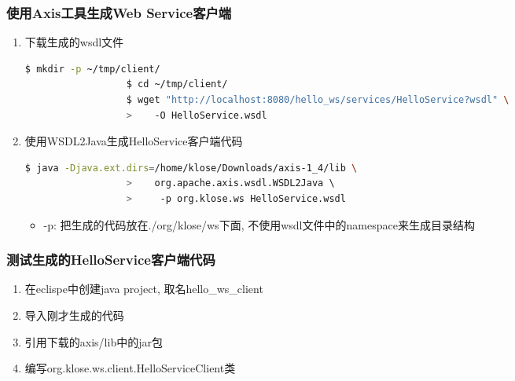 \documentclass[CJKutf8,compress,hyperref]{beamer}
\begin{document}
\begin{CJK}{UTF8}{song}
  \begin{frame}[containsverbatim] 
  \frametitle{使用Axis工具生成Web Service客户端}
  \begin{enumerate}
          \item 下载生成的wsdl文件
                  \begin{lstlisting}[language=bash]
                  $ mkdir -p ~/tmp/client/ 
                  $ cd ~/tmp/client/ 
                  $ wget "http://localhost:8080/hello_ws/services/HelloService?wsdl" \ 
                  >    -O HelloService.wsdl 
                  \end{lstlisting}
          \item 使用{\color{red}WSDL2Java}生成HelloService客户端代码\cite{WSDL2JAVA}
                  \begin{lstlisting}[language=bash]
                  $ java -Djava.ext.dirs=/home/klose/Downloads/axis-1_4/lib \ 
                  >    org.apache.axis.wsdl.WSDL2Java \ 
                  >     -p org.klose.ws HelloService.wsdl 
                  \end{lstlisting}
                  \begin{itemize}
                          \item {\color{red}-p}: 把生成的代码放在{\color{red}./org/klose/ws}下面, 不使用wsdl文件中的namespace来生成目录结构
                  \end{itemize}
  \end{enumerate}
  \end{frame}

  \begin{frame}[containsverbatim] 
  \frametitle{测试生成的HelloService客户端代码} 
  \begin{enumerate}
          \item 在eclispe中创建java project, 取名hello\_ws\_client
          \item 导入刚才生成的代码
          \item 引用下载的axis/lib中的jar包
          \item 编写org.klose.ws.client.HelloServiceClient类 
  \end{enumerate}
  \end{frame}


\end{CJK}
\end{document}
